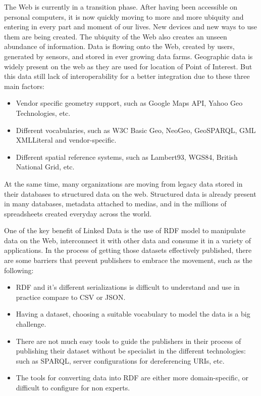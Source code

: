 The Web is currently in a transition phase. After having been accessible on personal computers, it is now 
quickly moving to more and more ubiquity and entering in every part and moment of our lives. New 
devices and new ways to use them are being created. The ubiquity of the Web also creates an unseen 
abundance of information. Data is flowing onto the Web, created by users, generated by sensors, and 
stored in ever growing data farms. Geographic data is widely present on the web as they are used for location 
of Point of Interest. But this data still lack of interoperability for a better integration due to these three main factors:
\begin{itemize}
\item Vendor specific geometry support, such as Google Maps API, Yahoo Geo Technologies, etc.
\item Different vocabularies, such as W3C Basic Geo, NeoGeo, GeoSPARQL, GML XMLLiteral and vendor-specific.
\item Different spatial reference systems, such as Lambert93, WGS84, British National Grid, etc.
\end{itemize}
At the same time, many organizations are moving from legacy data stored in their databases to structured data on the web. Structured data is already present in many databases, metadata attached to medias, and in the millions of spreadsheets created everyday across the world. 


One of the key benefit of Linked Data is the use of RDF model to manipulate data on the Web, interconnect it with other data and consume it in a variety of applications. In the process of getting those datasets effectively published, there are some barriers that prevent publishers to embrace the movement, such as the following:
\begin{itemize}
\item RDF and it's different serializations is difficult to understand and use in practice compare to CSV or JSON.
\item Having a dataset, choosing a suitable vocabulary to model the data is a big challenge.
\item There are not much easy tools to guide the publishers in their process of publishing their dataset without be specialist in the different technologies: such as SPARQL, server configurations for dereferencing URIs, etc.
\item The tools for converting data into RDF are either more domain-specific, or difficult to configure for non experts.
\end{itemize}

